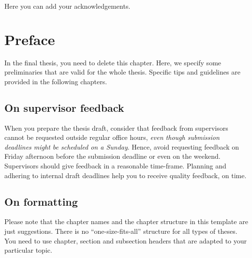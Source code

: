 \documentclass[a4paper,twoside]{bth}
\begin{document}
\cleardoublepage


\acknowledgments %
\noindent
Here you can add your acknowledgements.

\cleardoublepage


\tableofcontents

\cleardoublepage
\pagestyle{headings}


\chapter{Preface}
In the final thesis, you need to delete this chapter. Here, we specify some preliminaries that are valid for the whole thesis. Specific tips and guidelines are provided in the following chapters.

\section{On supervisor feedback}
When you prepare the thesis draft, consider that feedback from supervisors cannot be requested outside regular office hours, \emph{even though submission deadlines might be scheduled on a Sunday}. Hence, avoid requesting feedback on Friday afternoon before the submission deadline or even on the weekend. Supervisors should give feedback in a reasonable time-frame. Planning and adhering to internal draft deadlines help you to receive quality feedback, on time.

\section{On formatting}
Please note that the chapter names and the chapter structure in this template are
just suggestions. There is no ``one-size-fits-all'' structure for all types of theses.
You need to use chapter, section and subsection headers that are adapted to your
particular topic.
\end{document}
